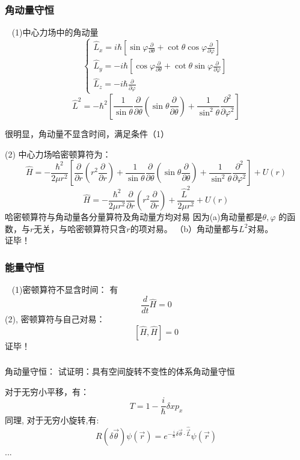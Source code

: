 \begin{frame}
    \frametitle{角动量守恒} 
    \例[5.试证明在中心力场中运动粒子的角动量是守恒量]{}                                
    \证~ (1)中心力场中的角动量
    $$
    \left\{\begin{array}{l}
        \hat{L}_{x}=i \hbar\left[\sin \varphi \frac{\partial}{\partial \theta}+\cot \theta \cos \varphi \frac{\partial}{\partial \varphi}\right] \\
        \hat{L}_{y}=-i \hbar\left[\cos \varphi \frac{\partial}{\partial \theta}+\cot \theta \sin \varphi \frac{\partial}{\partial \varphi}\right] \\
        \hat{L}_{z}=-i \hbar \frac{\partial}{\partial \varphi}
        \end{array}\right.
    $$
    $$ \hat{L}^{2}=-\hbar^{2}\left[\frac{1}{\sin \theta} \frac{\partial}{\partial \theta}\left(\sin \theta \frac{\partial}{\partial \theta}\right)+\frac{1}{\sin ^{2} \theta} \frac{\partial^{2}}{\partial \varphi^{2}}\right] $$
    
    很明显，角动量不显含时间，满足条件（1）\\
\end{frame}

\begin{frame} 
    (2) 中心力场哈密顿算符为： 
    $$
    \hat{H}=-\frac{\hbar^{2}}{2 \mu r^{2}}\left[\frac{\partial}{\partial r}\left(r^{2} \frac{\partial}{\partial r}\right)+\frac{1}{\sin \theta} \frac{\partial}{\partial \theta}\left(\sin \theta \frac{\partial}{\partial \theta}\right)+\frac{1}{\sin ^{2} \theta} \frac{\partial^{2}}{\partial \varphi^{2}}\right]+U(r)
    $$
    $$
    \hat{H}=-\frac{\hbar^{2}}{2 \mu r^{2}} \frac{\partial}{\partial r}\left(r^{2} \frac{\partial}{\partial r}\right)+\frac{\hat{L}^{2}}{2 \mu r^{2}}+U(r)
    $$
    哈密顿算符与角动量各分量算符及角动量方均对易 因为(a)角动量都是$\theta, \varphi$ 的函数，与$r$无关，与哈密顿算符只含$r$的项对易。
    （b）角动量都与$L^2$对易。\\
    证毕！
\end{frame}

\begin{frame} 
    \frametitle{能量守恒} 
    \例[6.试证明哈密顿算符不显含时间的体系能量守恒]{}                               
    \证~ (1)密顿算符不显含时间：
    有 $$\frac{d}{dt}\hat{H}=0$$ 
    (2), 密顿算符与自己对易： 
        $$ [\hat{H},\hat{H}]=0 $$
    证毕！
\end{frame}

\begin{frame} 
    \frametitle{} 
    \begin{tcolorbox2}{角动量守恒：}
        试证明：具有空间旋转不变性的体系角动量守恒                               
    \end{tcolorbox2}
    对于无穷小平移，有：
    $$T=1-\frac{i}{\hbar}\delta x p_x$$
    同理, 对于无穷小旋转,有:
    $$R(\delta \vec{\theta}) \psi(\vec{r})=e^{-\frac{i}{\hbar} \delta \vec{\theta} \cdot \widehat{\vec{L}}} \psi(\vec{r})
$$
...
\end{frame}


